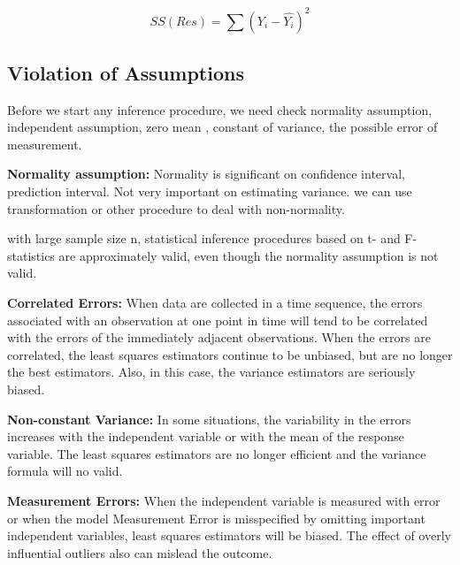 \documentclass[12pt]{article}
\begin{document}
$$SS(Res) = \sum(Y_i - \hat{Y_i})^2$$

\subsection{Violation of Assumptions}

Before we start any inference procedure, we need check normality assumption, independent assumption, zero mean , constant of variance, the possible error of measurement.

\textbf{Normality assumption:}
Normality is significant on confidence interval, prediction interval. Not very important on estimating variance. we can use
transformation or other procedure to deal with non-normality.

with large sample size n, statistical inference procedures based on t- and F-statistics are approximately valid, even though the normality assumption is not valid.

\textbf{Correlated Errors:}
When data are collected in a time sequence, the errors associated with an observation at one point in time will tend to be correlated with the errors of the immediately adjacent observations. When the errors are correlated, the least squares estimators continue to be unbiased, but are no longer the best estimators. Also, in this case, the variance estimators are seriously biased.

\textbf{Non-constant Variance:}
In some situations, the variability in the errors increases with the independent variable or with the mean of the response variable. The least squares estimators are no longer efficient and the variance formula will no valid.

\textbf{Measurement Errors:}
When the independent variable is measured with error or when the model Measurement Error is misspecified by omitting important independent variables, least squares estimators will be biased.
The effect of overly influential outliers also can mislead the outcome.
\end{document}
